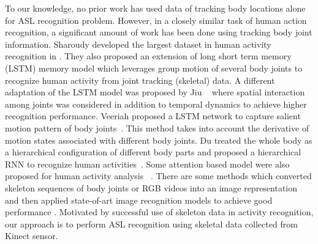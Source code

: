 \documentclass[10pt,twocolumn,letterpaper]{article}
\begin{document}
To our knowledge, no prior work has used data of tracking body locations alone for ASL recognition problem. However, in a closely similar task of human action recognition, a significant amount of work has been done using tracking body joint information. Sharoudy \etal developed the largest dataset in human activity recognition in \cite{7780484}. They also proposed an extension of long short term memory (LSTM) memory model which leverages group motion of several body joints to recognize human activity from joint tracking (skeletal) data. A different adaptation of the LSTM model was proposed by Jiu \etal ~\cite{8101019} where spatial interaction among joints was considered in addition to temporal dynamics to achieve higher recognition performance. Veeriah \etal proposed a LSTM network to capture salient motion pattern of body joints~\cite{7410817}. This method takes into account the derivative of motion states associated with different body joints. Du \etal treated the whole body as a hierarchical configuration of different body parts and proposed a hierarchical RNN to recognize human activities~\cite{7298714}. Some attention based model were also proposed for human activity analysis ~\cite{8226767, song2016end}. There are some methods which converted skeleton sequences of body joints or RGB videos into an image representation and then applied state-of-art image recognition models to achieve good performance \cite{DBLP:conf/cvpr/KeBASB17, DBLP:journals/corr/abs-1711-05941}.
Motivated by successful use of skeleton data in activity recognition, our approach is to perform ASL recognition using skeletal data collected from Kinect sensor.  
\end{document}

